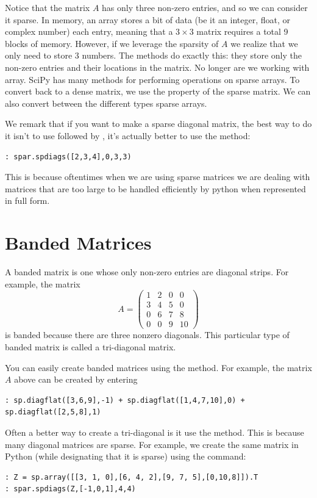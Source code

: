 Notice that the matrix $A$ has only three non-zero entries, and so we can consider it sparse. In memory, an array stores a bit of data (be it an integer, float, or complex number) each entry, meaning that a $3 \times 3$ matrix requires a total 9 blocks of memory. However, if we leverage the sparsity of $A$ we realize that we only need to store 3 numbers. The  methods do exactly this: they store only the non-zero entries and their locations in the matrix. No longer are we working with array.  SciPy has many methods for performing operations on sparse arrays.  To convert back to a dense matrix, we use the  property of the sparse matrix.  We can also convert between the different types sparse arrays.

We remark that if you want to make a sparse diagonal matrix, the
best way to do it isn't to use  followed by ,
it's actually better to use the  method:
\begin{lstlisting}[style=python]
: spar.spdiags([2,3,4],0,3,3)
\end{lstlisting}

This is because oftentimes when we are using sparse matrices we are dealing with matrices that are too large to be handled efficiently by python when represented in full form.

\section*{Banded Matrices}
A banded matrix is one whose only non-zero entries are diagonal
strips.  For example, the matrix
\[
A = \begin{pmatrix} 1&2&0&0\\3&4&5&0\\0&6&7&8\\0&0&9&10
\end{pmatrix}
\]
is banded because there are three nonzero diagonals.  This
particular type of banded matrix is called a tri-diagonal matrix.

You can easily create banded matrices using the  method.  For example, the matrix $A$ above can be created by
entering
\begin{lstlisting}[style=python]
: sp.diagflat([3,6,9],-1) + sp.diagflat([1,4,7,10],0) + sp.diagflat([2,5,8],1)
\end{lstlisting}

Often a better way to create a tri-diagonal is it use the  method. This is because many diagonal matrices are sparse. For example, we create the same matrix in Python (while designating that it is sparse) using the command:
\begin{lstlisting}[style=python]
: Z = sp.array([[3, 1, 0],[6, 4, 2],[9, 7, 5],[0,10,8]]).T
: spar.spdiags(Z,[-1,0,1],4,4)
\end{lstlisting}

